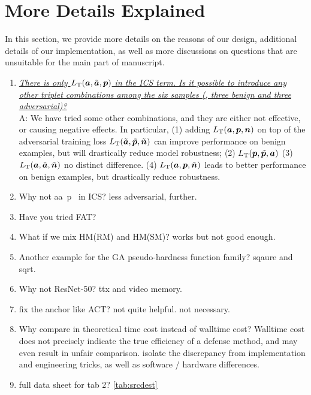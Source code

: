 \newpage
\appendix

\section{More Details Explained}

In this section, we provide more details on the reasons of our design,
additional details of our implementation, as well as more discussions
on questions that are unsuitable for the main part of manuscript.

\begin{enumerate}[noitemsep, label={Q.{\arabic*}}]
	\item \ul{\it There is only $L_\text{T}({\bm{a}}, \tilde{{\bm{a}}}, {\bm{p}})$ in the ICS
		term.  Is it possible to introduce any other triplet combinations among
		the six samples (\ie, three benign and three adversarial)?}\\
		A: We have tried some other combinations, and they are either not
		effective, or causing negative effects.
		In particular, (1) adding $L_\text{T}({\bm{a}}, {\bm{p}}, {\bm{n}})$ on top of the
		adversarial training loss
		$L_\text{T}(\tilde{{\bm{a}}},\tilde{{\bm{p}}},\tilde{{\bm{n}}})$ can improve
		performance on benign examples, but will drastically reduce model
		robustness;
		(2) $L_\text{T}({\bm{p}}, \tilde{{\bm{p}}}, {\bm{a}})$ 
		(3) $L_\text{T}({\bm{a}}, \tilde{{\bm{a}}}, \tilde{{\bm{n}}})$ no distinct difference.
		(4) $L_\text{T}({\bm{a}}, {\bm{p}}, \tilde{{\bm{n}}})$ leads to better performance
		on benign examples, but drastically reduce robustness.

	\item Why not aa~p~ in ICS?
		less adversarial, further.
	\item Have you tried FAT?
	\item What if we mix HM(RM) and HM(SM)?
		works but not good enough.
	\item Another example for the GA pseudo-hardness function family?
		sqaure and sqrt.
	\item Why not ResNet-50?
		ttx and video memory.
	\item fix the anchor like ACT?
		not quite helpful. not necessary.
	\item Why compare in theoretical time cost instead of walltime cost?
		Walltime cost does not precisely indicate the true efficiency
		of a defense method, and may even result in unfair comparison.
		isolate the discrepancy from implementation and engineering tricks,
		as well as software / hardware differences.
	\item full data sheet for tab 2?
		\cref{tab:srcdest}


\end{enumerate}
